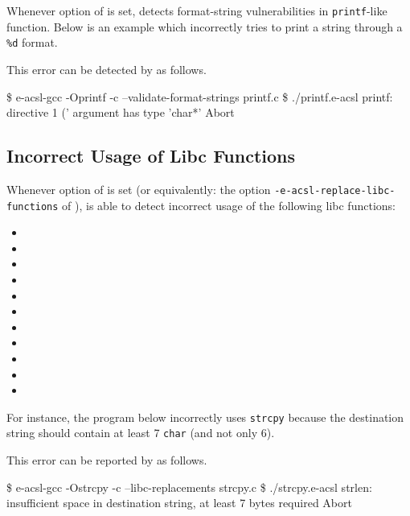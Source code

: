 Whenever option  of \eacslgcc is set, \eacsl
detects format-string vulnerabilities in \texttt{printf}-like function. Below is
an example which incorrectly tries to print a string through a \texttt{\%d}
format.


This error can be detected by \eacsl as follows.

\begin{logs}
\$ e-acsl-gcc -Oprintf -c --validate-format-strings printf.c
\$ ./printf.e-acsl
printf: directive 1 ('%
argument has type 'char*'
Abort
\end{logs}

\subsection{Incorrect Usage of Libc Functions}

Whenever option  of \eacslgcc is set
(or equivalently: the option \texttt{-e-acsl-replace-libc-functions} of \framac),
\eacsl is able to detect incorrect usage of the following libc functions:
\begin{itemize}
  \item {}
  \item {}
  \item {}
  \item {}
  \item {}
  \item {}
  \item {}
  \item {}
  \item {}
  \item {}
  \item {}
\end{itemize}

For instance, the program below incorrectly uses \texttt{strcpy} because the
destination string should contain at least 7 \texttt{char} (and not only 6).


This error can be reported by \eacsl as follows.

\begin{logs}
\$ e-acsl-gcc -Ostrcpy -c --libc-replacements strcpy.c
\$ ./strcpy.e-acsl
strlen: insufficient space in destination string, at least 7 bytes required
Abort
\end{logs}

